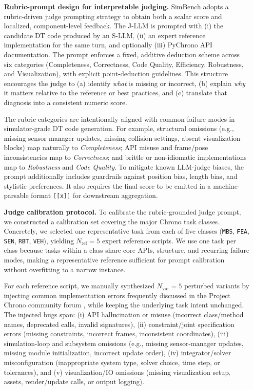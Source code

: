 \documentclass{ieeeaccess}
\begin{document}
\medskip
\noindent\textbf{Rubric-prompt design for interpretable judging.}
SimBench adopts a rubric-driven judge prompting strategy to obtain both a scalar score and localized, component-level feedback.
The J-LLM is prompted with (i) the candidate DT code produced by an S-LLM, (ii) an expert reference implementation for the same turn, and optionally (iii) PyChrono API documentation.
The prompt enforces a fixed, additive deduction scheme across six categories (Completeness, Correctness, Code Quality, Efficiency, Robustness, and Visualization), with explicit point-deduction guidelines.
This structure encourages the judge to (a) identify \emph{what} is missing or incorrect, (b) explain \emph{why} it matters relative to the reference or best practices, and (c) translate that diagnosis into a consistent numeric score.

\vspace{2pt}
\noindent
The rubric categories are intentionally aligned with common failure modes in simulator-grade DT code generation.
For example, structural omissions (e.g., missing sensor manager updates, missing collision settings, absent visualization blocks) map naturally to \emph{Completeness}; API misuse and frame/pose inconsistencies map to \emph{Correctness}; and brittle or non-idiomatic implementations map to \emph{Robustness} and \emph{Code Quality}.
To mitigate known LLM-judge biases, the prompt additionally includes guardrails against position bias, length bias, and stylistic preferences. It also requires the final score to be emitted in a machine-parsable format \texttt{[[x]]} for downstream aggregation.

\vspace{2pt}
\noindent\textbf{Judge calibration protocol.}
To calibrate the rubric-grounded judge prompt, we constructed a calibration set covering the major Chrono task classes. Concretely, we selected one representative task from each of five classes (\texttt{MBS}, \texttt{FEA}, \texttt{SEN}, \texttt{RBT}, \texttt{VEH}), yielding $N_{\text{ref}}=5$ expert reference scripts. We use one task per class because tasks within a class share core APIs, structure, and recurring failure modes, making a representative reference sufficient for prompt calibration without overfitting to a narrow instance.

For each reference script, we manually synthesized $N_{\text{var}}=5$ perturbed variants by injecting common implementation errors frequently discussed in the Project Chrono community forum \cite{projectChronoForum}, while keeping the underlying task intent unchanged. The injected bugs span: (i) API hallucination or misuse (incorrect class/method names, deprecated calls, invalid signatures), (ii) constraint/joint specification errors (missing constraints, incorrect frames, inconsistent coordinates), (iii) simulation-loop and subsystem omissions (e.g., missing sensor-manager updates, missing module initialization, incorrect update order), (iv) integrator/solver misconfiguration (inappropriate system type, solver choice, time step, or tolerances), and (v) visualization/IO omissions (missing visualization setup, assets, render/update calls, or output logging).
\end{document}
